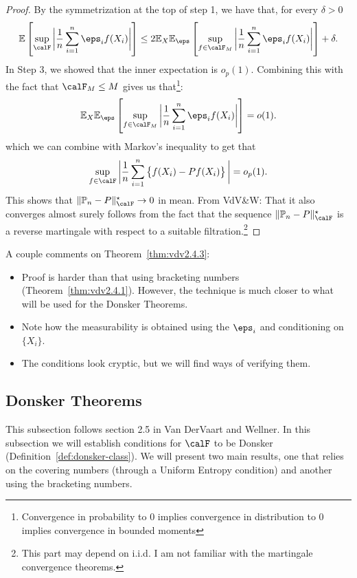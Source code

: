 \begin{proof}
	By the symmetrization at the top of step 1, we have that, for every \(\delta > 0\)
	 \[
		 \E\left[\sup_{\calF}\bigg|\frac{1}{n}\sum_{i=1}^n \eps_if(X_i) \bigg|\right] \leq  2\E_X\E_\eps\left[\sup_{f\in\calF_M}\bigg|\frac{1}{n}\sum_{i=1}^n \eps_if(X_i)\bigg|\right] + \delta 
	.\] 
	In Step 3, we showed that the inner expectation is \(o_p(1)\). Combining this with the fact that \(\calF_M \leq M\) gives us that\footnote{Convergence in probability to 0 implies convergence in distribution to 0 implies convergence in bounded moments}:
	\[
		\E_X\E_\eps\left[\sup_{f\in\calF_M}\bigg|\frac{1}{n}\sum_{i=1}^n \eps_if(X_i)\bigg|\right] = o(1)
	.\] 
	which we can combine with Markov's  inequality to get that
	\[
		\sup_{f\in\calF}\bigg|\frac{1}{n}\sum_{i=1}^n \left\{f(X_i) - Pf(X_i)\right\}\bigg| = o_p(1)
	.\]
	This shows that \(\|\P_n-P\|_\calF^\star \to 0\) in mean. From VdV\&W: That it also converges almost surely follows from the fact that the sequence \(\|\P_n-P\|_\calF^\star\) is a reverse martingale with respect to a suitable filtration.\footnote{This part may depend on i.i.d. I am not familiar with the martingale convergence theorems.}  
\end{proof}

\begin{remark*}
	A couple comments on Theorem~\ref{thm:vdv2.4.3}:
	\begin{itemize}
		\item Proof is harder than that using bracketing numbers (Theorem~\ref{thm:vdv2.4.1}). However, the technique is much closer to what will be used for the Donsker Theorems. 
		\item Note how the measurability is obtained using the \(\eps_i\) and conditioning on  \(\{X_i\}\).
		\item The conditions look cryptic, but we will find ways of verifying them.
	\end{itemize}
\end{remark*}

\subsection{Donsker Theorems}%
\label{subsec:Donsker}

This subsection follows section 2.5 in Van DerVaart and Wellner. In this subsection we will establish conditions for \(\calF\) to be Donsker (Definition~\ref{def:donsker-class}). We will present two main results, one that relies on the covering numbers (through a Uniform Entropy condition) and another using the bracketing numbers. 

